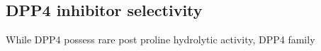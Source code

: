 \subsection{DPP4 inhibitor selectivity}
While DPP4 possess rare post proline hydrolytic activity, DPP4 family 
